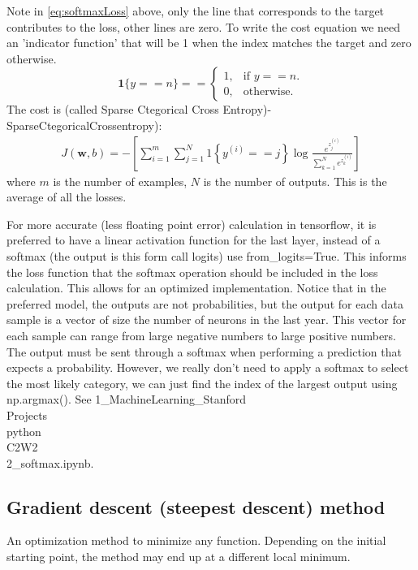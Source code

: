 \documentclass[12pt]{report}
\begin{document}
Note in \ref{eq:softmaxLoss} above, only the line that corresponds to the target contributes to the loss, other lines are zero. To write the cost equation we need an 'indicator function' that will be 1 when the index matches the target and zero otherwise.
$$\mathbf{1}\{y == n\} = =\begin{cases}
  1, & \text{if $y==n$}.\\
  0, & \text{otherwise}.
\end{cases}$$
The cost is (called Sparse Ctegorical Cross Entropy)-SparseCtegoricalCrossentropy):
\begin{align}
  J(\mathbf{w},b) = - \left[ \sum_{i=1}^{m} \sum_{j=1}^{N}  1\left\{y^{(i)} == j\right\} \log \frac{e^{z^{(i)}_j}}{\sum_{k=1}^N e^{z^{(i)}_k} }\right] \tag{4}
\end{align}
where $m$ is the number of examples, $N$ is the number of outputs. This is the average of all the losses.

For more accurate (less floating point error) calculation in tensorflow, it is preferred to have a linear activation function for the last layer, instead of a softmax (the output is this form call logits) use from\_logits=True. This informs the loss function that the softmax operation should be included in the loss calculation. This allows for an optimized implementation. Notice that in the preferred model, the outputs are not probabilities, but the output for each data sample is a vector of size the number of neurons in the last year. This vector for each sample can range from large negative numbers to large positive numbers. The output must be sent through a softmax when performing a prediction that expects a probability. However, we really don't need to apply a softmax to select the most likely category, we can just find the index of the largest output using np.argmax(). See 1\_MachineLearning\_Stanford\\Projects\\python\\C2W2\\2\_softmax.ipynb.



\subsection{Gradient descent (steepest descent) method}
\label{sec:gradient}

An optimization method to minimize any function. Depending on the initial starting point, the method may end up at a different local minimum. \\
\end{document}
